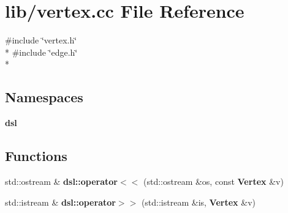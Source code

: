 \section{lib/vertex.cc File Reference}
\label{lib_2vertex_8cc}
{\ttfamily \#include \char`\"{}vertex.\-h\char`\"{}}\\*
{\ttfamily \#include \char`\"{}edge.\-h\char`\"{}}\\*
\subsection*{Namespaces}
\begin{DoxyCompactItemize}
\item 
{\bf dsl}
\end{DoxyCompactItemize}
\subsection*{Functions}
\begin{DoxyCompactItemize}
\item 
std\-::ostream \& {\bf dsl\-::operator$<$$<$} (std\-::ostream \&os, const {\bf Vertex} \&v)
\item 
std\-::istream \& {\bf dsl\-::operator$>$$>$} (std\-::istream \&is, {\bf Vertex} \&v)
\end{DoxyCompactItemize}
